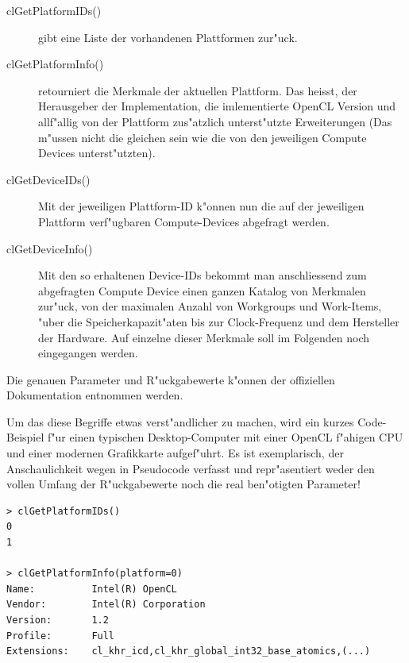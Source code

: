 \begin{refsection}
\begin{description}
 \item [clGetPlatformIDs()] gibt eine Liste der vorhandenen Plattformen zur"uck.
 \item [clGetPlatformInfo()] retourniert die Merkmale der aktuellen Plattform. Das heisst,
                            der Herausgeber der Implementation, die imlementierte 
                            OpenCL Version und allf"allig von der Plattform 
                            zus"atzlich unterst"utzte Erweiterungen (Das m"ussen
                            nicht die gleichen sein wie die von den jeweiligen
                            Compute Devices unterst"utzten).
 \item [clGetDeviceIDs()]   Mit der jeweiligen Plattform-ID k"onnen nun die auf der 
                            jeweiligen Plattform verf"ugbaren Compute-Devices abgefragt 
                            werden.
 \item [clGetDeviceInfo()]  Mit den so erhaltenen Device-IDs bekommt man anschliessend 
                            zum abgefragten Compute Device einen ganzen Katalog von
                            Merkmalen zur"uck, von der maximalen Anzahl von Workgroups
                            und Work-Items, "uber die Speicherkapazit"aten bis zur 
                            Clock-Frequenz und dem Hersteller der Hardware. Auf einzelne 
                            dieser Merkmale soll im Folgenden noch eingegangen werden.
\end{description}

\noindent Die genauen Parameter und R"uckgabewerte k"onnen der offiziellen
Dokumentation \cite{crypto:opencl_ref} entnommen werden.

Um das diese Begriffe etwas verst"andlicher zu machen, wird ein kurzes
Code-Beispiel f"ur einen typischen Desktop-Computer mit einer OpenCL f"ahigen
CPU und einer modernen Grafikkarte aufgef"uhrt. Es ist exemplarisch, der
Anschaulichkeit wegen in Pseudocode verfasst und repr"asentiert weder den vollen
Umfang der R"uckgabewerte noch die real ben"otigten Parameter!

\begin{small}
\begin{verbatim}
> clGetPlatformIDs()
0
1

> clGetPlatformInfo(platform=0)
Name:          Intel(R) OpenCL
Vendor:        Intel(R) Corporation
Version:       1.2
Profile:       Full
Extensions:    cl_khr_icd,cl_khr_global_int32_base_atomics,(...)


\end{verbatim}
\end{small}
\end{refsection}
